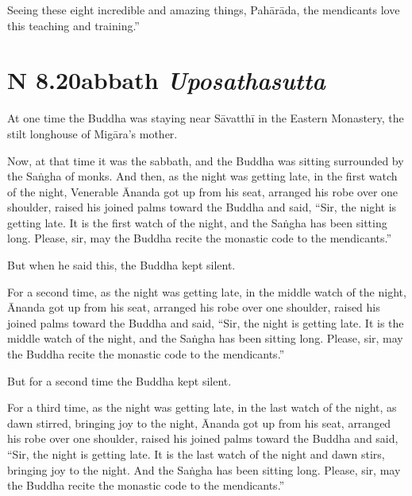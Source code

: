 \documentclass[12pt,openany]{book}%
\newcommand*{\suttatitleacronym}[1]{\smaller[2]{#1}\vspace*{.3em}}
\newcommand*{\suttatitletranslation}[1]{\linebreak{#1}}
\newcommand*{\suttatitleroot}[1]{\linebreak\smaller[2]\itshape{#1}}
\newcommand*{\tocacronym}[1]{\hspace*{-3.3em}{#1}\quad}
\newcommand*{\toctranslation}[1]{#1}
\newcommand*{\tocroot}[1]{(\textit{#1})}
\begin{document}
Seeing these eight incredible and amazing things, \textsanskrit{Pahārāda}, the mendicants love this teaching and training.” 

%
\section*{{\suttatitleacronym AN 8.20}{\suttatitletranslation Sabbath }{\suttatitleroot Uposathasutta}}
\addcontentsline{toc}{section}{\tocacronym{AN 8.20} \toctranslation{Sabbath } \tocroot{Uposathasutta}}

At one time the Buddha was staying near \textsanskrit{Sāvatthī} in the Eastern Monastery, the stilt longhouse of \textsanskrit{Migāra}’s mother. 

Now, at that time it was the sabbath, and the Buddha was sitting surrounded by the \textsanskrit{Saṅgha} of monks. And then, as the night was getting late, in the first watch of the night, Venerable Ānanda got up from his seat, arranged his robe over one shoulder, raised his joined palms toward the Buddha and said, “Sir, the night is getting late. It is the first watch of the night, and the \textsanskrit{Saṅgha} has been sitting long. Please, sir, may the Buddha recite the monastic code to the mendicants.” 

But when he said this, the Buddha kept silent. 

For a second time, as the night was getting late, in the middle watch of the night, Ānanda got up from his seat, arranged his robe over one shoulder, raised his joined palms toward the Buddha and said, “Sir, the night is getting late. It is the middle watch of the night, and the \textsanskrit{Saṅgha} has been sitting long. Please, sir, may the Buddha recite the monastic code to the mendicants.” 

But for a second time the Buddha kept silent. 

For a third time, as the night was getting late, in the last watch of the night, as dawn stirred, bringing joy to the night, Ānanda got up from his seat, arranged his robe over one shoulder, raised his joined palms toward the Buddha and said, “Sir, the night is getting late. It is the last watch of the night and dawn stirs, bringing joy to the night. And the \textsanskrit{Saṅgha} has been sitting long. Please, sir, may the Buddha recite the monastic code to the mendicants.” 
\end{document}
